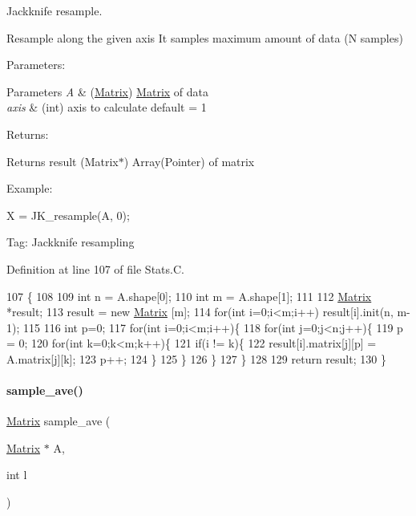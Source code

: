 Jackknife resample. 

Resample along the given axis It samples maximum amount of data (N samples)

Parameters\+: 
\begin{DoxyParams}{Parameters}
{\em A} & (\hyperlink{classMatrix}{Matrix}) \hyperlink{classMatrix}{Matrix} of data \\
\hline
{\em axis} & (int) axis to calculate default = 1\\
\hline
\end{DoxyParams}
Returns\+: \begin{DoxyReturn}{Returns}
result (Matrix$\ast$) Array(\+Pointer) of matrix
\end{DoxyReturn}
Example\+:

X = J\+K\+\_\+resample(\+A, 0);

Tag\+: Jackknife resampling 

Definition at line 107 of file Stats.\+C.


\begin{DoxyCode}
107                                        \{
108   
109   \textcolor{keywordtype}{int} n = A.shape[0];
110   \textcolor{keywordtype}{int} m = A.shape[1];
111 
112   \hyperlink{classMatrix}{Matrix} *result;
113   result = \textcolor{keyword}{new} \hyperlink{classMatrix}{Matrix} [m];
114   \textcolor{keywordflow}{for}(\textcolor{keywordtype}{int} i=0;i<m;i++) result[i].init(n, m-1);
115 
116   \textcolor{keywordtype}{int} p=0;
117   \textcolor{keywordflow}{for}(\textcolor{keywordtype}{int} i=0;i<m;i++)\{
118     \textcolor{keywordflow}{for}(\textcolor{keywordtype}{int} j=0;j<n;j++)\{
119       p = 0;
120       \textcolor{keywordflow}{for}(\textcolor{keywordtype}{int} k=0;k<m;k++)\{
121         \textcolor{keywordflow}{if}(i != k)\{
122           result[i].matrix[j][p] = A.matrix[j][k];
123           p++;
124         \}
125       \}
126     \}
127   \}
128 
129   \textcolor{keywordflow}{return} result;
130 \}
\end{DoxyCode}
\mbox{\label{Stats_8C_affd6f6d5163a812e041030361c401f90}} 
\paragraph{\texorpdfstring{sample\+\_\+ave()}{sample\_ave()}}
{\footnotesize\ttfamily \hyperlink{classMatrix}{Matrix} sample\+\_\+ave (\begin{DoxyParamCaption}\item[{\hyperlink{classMatrix}{Matrix} $\ast$}]{A,  }\item[{int}]{l }\end{DoxyParamCaption})}



